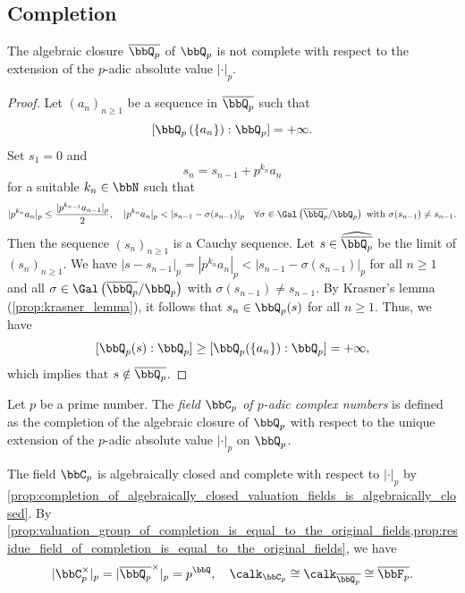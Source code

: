 
\subsection{Completion}

    \begin{proposition}\label{prop:algebraically_closure_of_Q_p_is_not_complete}
        The algebraic closure \(\overline{\bbQ_p}\) of \(\bbQ_p\) is not complete with respect to the extension of the \(p\)-adic absolute value \(|\cdot|_p\).
    \end{proposition}
    \begin{proof}
        Let \((a_n)_{n \geq 1}\) be a sequence in \(\overline{\bbQ_p}\) such that
        \[ [\bbQ_p\left(\{a_n\}\right): \bbQ_p] = +\infty. \]
        Set \(s_1 = 0\) and
        \[ s_n = s_{n-1} + p^{k_n} a_n \]
        for a suitable \(k_n \in \bbN\) such that
        \[ |p^{k_n} a_n|_p \leq \frac{|p^{k_{n-1}} a_{n-1}|_p}{2},\quad |p^{k_n} a_n|_p < |s_{n-1} - \sigma(s_{n-1})|_p \quad \forall \sigma \in \Gal\left(\overline{\bbQ_p} / \bbQ_p\right) \text{ with } \sigma(s_{n-1}) \neq s_{n-1}. \]
        Then the sequence \((s_n)_{n \geq 1}\) is a Cauchy sequence.
        Let \(s \in \widehat{\overline{\bbQ_p}}\) be the limit of \((s_n)_{n \geq 1}\).
        We have \(|s - s_{n-1}|_p = |p^{k_n} a_n|_p < |s_{n-1} - \sigma(s_{n-1})|_p\) for all \(n \geq 1\) and all \(\sigma \in \Gal\left(\overline{\bbQ_p} / \bbQ_p\right)\) with \(\sigma(s_{n-1}) \neq s_{n-1}\).
        By Krasner's lemma (\cref{prop:krasner_lemma}), it follows that \(s_n \in \bbQ_p(s)\) for all \(n \geq 1\).
        Thus, we have 
        \[ [\bbQ_p(s): \bbQ_p] \geq [\bbQ_p(\{a_n\}): \bbQ_p] = +\infty, \]
        which implies that \(s \notin \overline{\bbQ_p}\).
    \end{proof}
    
    \begin{construction}\label{constr:p-adic_complex_number}
        Let \(p\) be a prime number.
        The \emph{field \(\bbC_p\) of \(p\)-adic complex numbers} is defined as the completion of the algebraic closure of \(\bbQ_p\) with respect to the unique extension of the \(p\)-adic absolute value \(|\cdot|_p\) on \(\bbQ_p\).
    \end{construction}

    The field \(\bbC_p\) is algebraically closed and complete with respect to \(|\cdot|_p\) by \cref{prop:completion_of_algebraically_closed_valuation_fields_is_algebraically_closed}.
    By \cref{prop:valuation_group_of_completion_is_equal_to_the_original_fields,prop:residue_field_of_completion_is_equal_to_the_original_fields}, we have
    \[ |\bbC_p^\times|_p = |\overline{\bbQ_p}^\times|_p = p^\bbQ, \quad \calk_{\bbC_p} \cong \calk_{\overline{\bbQ_p}} \cong \overline{\bbF_p}. \]

